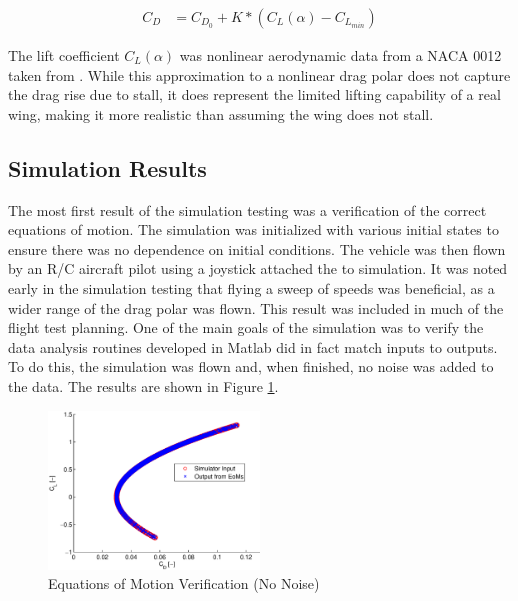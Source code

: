 \documentclass[]{aiaa-tc}%
\begin{document}
\begin{align}
C_D &= C_{D_0} + K*(C_L(\alpha)-C_{L_{min}})
\end{align}

The lift coefficient $C_L(\alpha)$ was nonlinear aerodynamic data from a NACA 0012 taken from \cite{osborne2007transitions}. While this approximation to a nonlinear drag polar does not capture the drag rise due to stall, it does represent the limited lifting capability of a real wing, making it more realistic than assuming the wing does not stall.
\subsection*{Simulation Results}
The most first result of the simulation testing was a verification of the correct equations of motion. The simulation was initialized with various initial states to ensure there was no dependence on initial conditions. The vehicle was then flown by an R/C aircraft pilot using a joystick attached the to simulation. It was noted early in the simulation testing that flying a sweep of speeds was beneficial, as a wider range of the drag polar was flown. This result was included in much of the flight test planning.
One of the main goals of the simulation was to verify the data analysis routines developed in Matlab did in fact match inputs to outputs. To do this, the simulation was flown and, when finished, no noise was added to the data. The results are shown in Figure \ref{dragPolarNoNoise}.

\begin{figure}[h!]
  \caption{Equations of Motion Verification (No Noise)} \label{dragPolarNoNoise}
  \centering
    \includegraphics[width=0.5\textwidth]{figures/dragPolarNoNoise.eps}
\end{figure}
\end{document}
